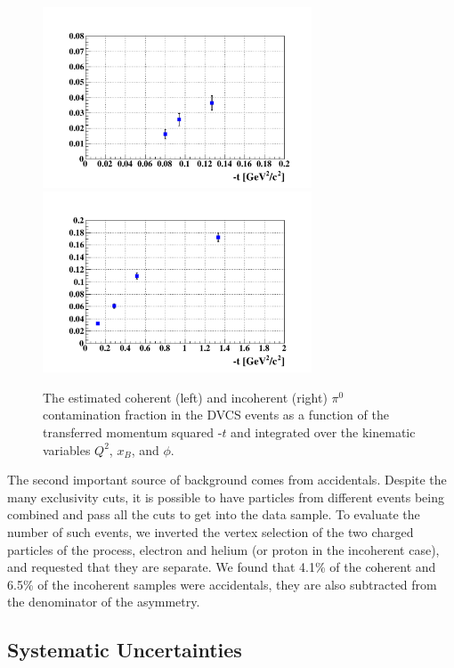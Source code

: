 \documentclass[aps,prc,preprint,superscriptaddress]{revtex4}
\begin{document}
\begin{figure}[tbp]
\includegraphics[width=8cm]{T_ratio_pi0_dvcs_Coh_t.pdf}
\includegraphics[width=8cm]{T_ratio_pi0_dvcs_InCoh_t.pdf}
\caption{The estimated coherent (left) and incoherent (right) $\pi^{0}$ 
contamination fraction in the DVCS events as a function of the 
transferred momentum squared -$t$ and integrated over the kinematic 
variables $Q^2$, $x_B$, and $\phi$.}
\label{fig:cont_yield}
\end{figure}

The second important source of background comes from accidentals. Despite the many exclusivity cuts, it is 
possible to have particles from different events being combined and pass all the cuts to get 
into the data sample. To evaluate the number of such events, we inverted the vertex selection 
of the two charged 
particles of the process, electron and helium (or proton in the incoherent case), and requested that they
are separate. We found that 4.1\% of the coherent and 6.5\% of the incoherent samples were accidentals,
they are also subtracted from the denominator of the asymmetry. 

\subsection{Systematic Uncertainties}
\end{document}
